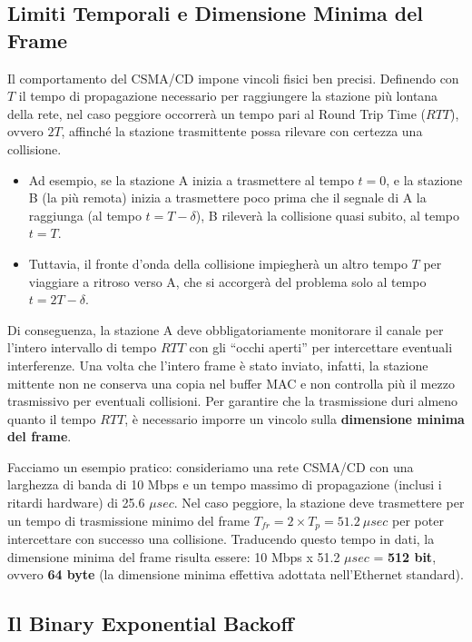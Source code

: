 \documentclass[
  italian,
  openany]{book}
\begin{document}
\subsection{Limiti Temporali e Dimensione Minima del
Frame}\label{limiti-temporali-e-dimensione-minima-del-frame}

Il comportamento del CSMA/CD impone vincoli fisici ben precisi.
Definendo con \(T\) il tempo di propagazione necessario per raggiungere
la stazione più lontana della rete, nel caso peggiore occorrerà un tempo
pari al Round Trip Time (\(RTT\)), ovvero \(2T\), affinché la stazione
trasmittente possa rilevare con certezza una collisione.

\begin{itemize}
\item
  Ad esempio, se la stazione A inizia a trasmettere al tempo \(t=0\), e
  la stazione B (la più remota) inizia a trasmettere poco prima che il
  segnale di A la raggiunga (al tempo \(t=T-\delta\)), B rileverà la
  collisione quasi subito, al tempo \(t=T\).
\item
  Tuttavia, il fronte d'onda della collisione impiegherà un altro tempo
  \(T\) per viaggiare a ritroso verso A, che si accorgerà del problema
  solo al tempo \(t=2T-\delta\).
\end{itemize}

Di conseguenza, la stazione A deve obbligatoriamente monitorare il
canale per l'intero intervallo di tempo \(RTT\) con gli ``occhi aperti''
per intercettare eventuali interferenze. Una volta che l'intero frame è
stato inviato, infatti, la stazione mittente non ne conserva una copia
nel buffer MAC e non controlla più il mezzo trasmissivo per eventuali
collisioni. Per garantire che la trasmissione duri almeno quanto il
tempo \(RTT\), è necessario imporre un vincolo sulla \textbf{dimensione
minima del frame}.

Facciamo un esempio pratico: consideriamo una rete CSMA/CD con una
larghezza di banda di 10 Mbps e un tempo massimo di propagazione
(inclusi i ritardi hardware) di 25.6 \(\mu sec\). Nel caso peggiore, la
stazione deve trasmettere per un tempo di trasmissione minimo del frame
\(T_{fr} = 2 \times T_{p} = 51.2~\mu sec\) per poter intercettare con
successo una collisione. Traducendo questo tempo in dati, la dimensione
minima del frame risulta essere: 10 Mbps x 51.2 \(\mu sec\) =
\textbf{512 bit}, ovvero \textbf{64 byte} (la dimensione minima
effettiva adottata nell'Ethernet standard).

\subsection{Il Binary Exponential
Backoff}\label{il-binary-exponential-backoff}
\end{document}
